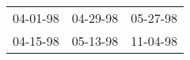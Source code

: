 \begin{supertabular}{p{0.33\columnwidth}p{0.33\columnwidth}p{0.33\columnwidth}}
 04-01-98\textsuperscript{} &  04-29-98\textsuperscript{} &  05-27-98\textsuperscript{} \\
 04-15-98\textsuperscript{} &  05-13-98\textsuperscript{} &  11-04-98\textsuperscript{} \\
\end{supertabular}
